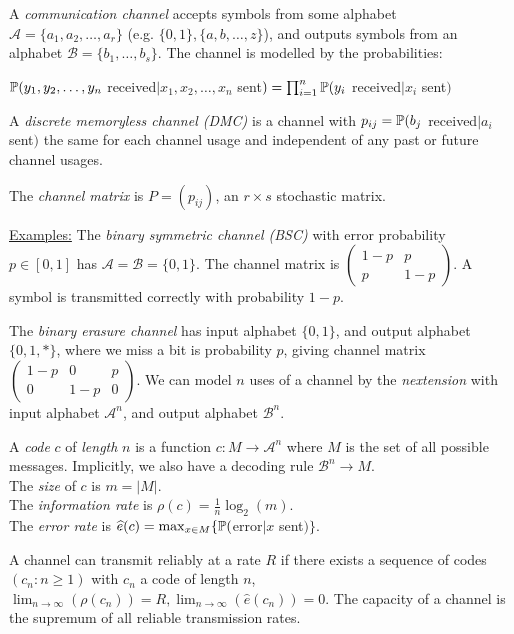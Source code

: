 \documentclass[10pt,a4paper]{article}
\begin{document}
A \emph{communication channel} accepts symbols from some alphabet $\mathscr{A} = \{a_1, a_2, \ldots, a_r\}$ (e.g. $\{0,1\}, \{a,b,\ldots,z\}$), and outputs symbols from an alphabet $\mathscr{B} = \{b_1, \ldots, b_s\}$. The channel is modelled by the probabilities:
\begin{center}$\P(y_1,y_2,\ldots,y_n$ received$| x_1,x_2,\ldots,x_n$ sent$) = \prod_{i=1}^{n} \P(y_i$ received$| x_i$ sent$)$\end{center}

A \emph{discrete memoryless channel (DMC)} is a channel with $p_{ij} = \P(b_j$ received$|a_i$ sent$)$ the same for each channel usage and independent of any past or future channel usages.

The \emph{channel matrix} is $P = (p_{ij})$, an $r \times s$ stochastic matrix.

\underline{Examples:} The \emph{binary symmetric channel (BSC)} with error probability $p \in [0,1]$ has $\mathscr{A} = \mathscr{B} = \{0,1\}$. The channel matrix is $\begin{pmatrix} 1-p & p \\ p & 1-p \end{pmatrix}$. A symbol is transmitted correctly with probability $1-p$.

The \emph{binary erasure channel} has input alphabet $\{0,1\}$, and output alphabet $\{0, 1, \ast\}$, where we miss a bit is probability $p$, giving channel matrix $\begin{pmatrix} 1-p & 0 & p \\ 0 & 1-p & 0\end{pmatrix}$. We can model $n$ uses of a channel by the \emph{n\th extension} with input alphabet $\mathscr{A}^n$, and output alphabet $\mathscr{B}^n$.

A \emph{code} $c$ of \emph{length} $n$ is a function $c: M \to \mathscr{A}^n$ where $M$ is the set of all possible messages. Implicitly, we also have a decoding rule $\mathscr{B}^n \to M$.\\
The \emph{size} of $c$ is $m = |M|$. \\
The \emph{information rate} is $\rho(c) = \frac{1}{n}\log_2(m)$. \\
The \emph{error rate} is $\hat{e}(c) = \max_{x\in M} \{\P($error$|x$ sent$)\}$.

A channel can transmit reliably at a rate $R$ if there exists a sequence of codes $(c_n: n\geq 1)$ with $c_n$ a code of length $n$, $\lim_{n\to \infty}(\rho(c_n)) =R, \lim_{n\to\infty}(\hat{e}(c_n)) = 0$. The capacity of a channel is the supremum of all reliable transmission rates.
\end{document}
